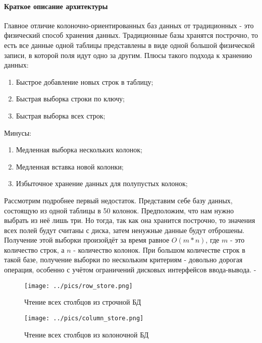 \documentclass{matmex-diploma}
\begin{document}
        \paragraph{Краткое описание архитектуры}
            Главное отличие колоночно-ориентированных баз данных от традиционных - это физический способ хранения данных. Традиционные базы хранятся построчно, то есть все данные одной таблицы представлены в виде одной большой физической записи, в которой поля идут одно за другим.
        Плюсы такого подхода к хранению данных:
        \begin{enumerate}
            \item Быстрое добавление новых строк в таблицу;
            \item Быстрая выборка строки по ключу;
            \item Быстрая выборка всех строк;
        \end{enumerate}
        Минусы:
        \begin{enumerate}
            \item Медленная выборка нескольких колонок;
            \item Медленная вставка новой колонки;
            \item Избыточное хранение данных для полупустых колонок;
        \end{enumerate}
        
        Рассмотрим подробнее первый недостаток. Представим себе базу данных, состоящую из одной таблицы в 50 колонок. Предположим, что нам нужно выбрать из неё лишь три. Но тогда, так как она хранится построчно, то значения всех полей будут считаны с диска, затем ненужные данные будут отброшены. Получение этой выборки произойдёт за время равное $O(m * n)$, где $m$ - это количество строк, а $n$ - количество колонок. При большом количестве строк в такой базе, получение выборки по нескольким критериям - довольно дорогая операция, особенно с учётом ограничений дисковых интерфейсов ввода-вывода. - \cite{habr:column_db}
        
        \begin{figure}[h]
            \centering
            \texttt{[image: ../pics/row\_store.png]}
            \caption{Чтение всех столбцов из строчной БД}
            \label{row_store}
        \end{figure}
        
        \begin{figure}[h]
            \centering
            \texttt{[image: ../pics/column\_store.png]}
            \caption{Чтение всех столбцов из колоночной БД}
            \label{column_store}
        \end{figure}
        
\end{document}
